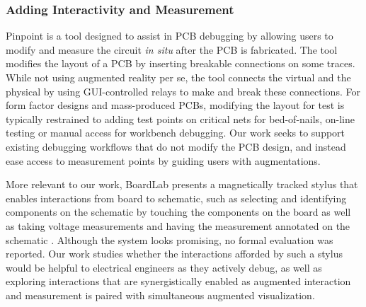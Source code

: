 \documentclass [11pt, proquest] {uwthesis}[2020/02/24]
\begin{document}
\subsubsection{Adding Interactivity and Measurement}
Pinpoint \cite{Strasnick2019Pinpoint} is a tool designed to assist in PCB debugging by allowing users to modify and measure the circuit \textit{in situ} after the PCB is fabricated. The tool modifies the layout of a PCB by inserting breakable connections on some traces. While not using augmented reality per se, the tool connects the virtual and the physical by using GUI-controlled relays to make and break these connections. For form factor designs and mass-produced PCBs, modifying the layout for test is typically restrained to adding test points on critical nets for bed-of-nails, on-line testing or manual access for workbench debugging. Our work seeks to support existing debugging workflows that do not modify the PCB design, and instead ease access to measurement points by guiding users with augmentations.

More relevant to our work, BoardLab presents a magnetically tracked stylus that enables interactions from board to schematic, such as selecting and identifying components on the schematic by touching the components on the board as well as taking voltage measurements and having the measurement annotated on the schematic \cite{Goyal2013BoardLab}.
Although the system looks promising, no formal evaluation was reported.
Our work studies whether the interactions afforded by such a stylus would be helpful to electrical engineers as they actively debug, as well as exploring interactions that are synergistically enabled as augmented interaction and measurement is paired with simultaneous augmented visualization.
\end{document}
